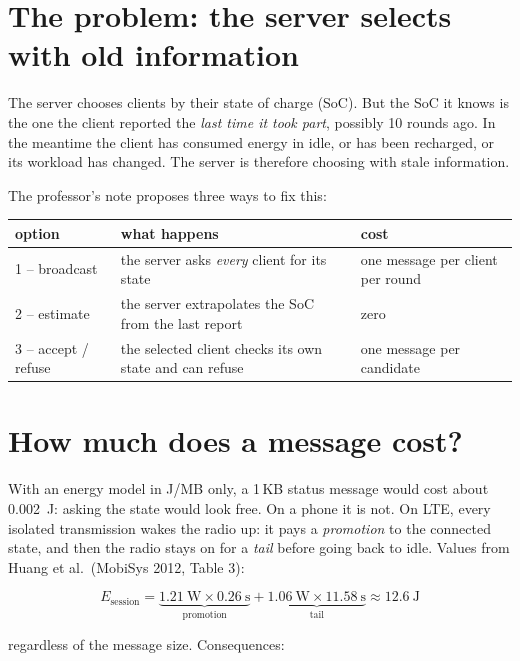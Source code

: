 \documentclass[11pt,a4paper]{article}
\begin{document}
\section{The problem: the server selects with old information}

The server chooses clients by their state of charge (SoC). But the SoC it knows
is the one the client reported the \emph{last time it took part}, possibly 10
rounds ago. In the meantime the client has consumed energy in idle, or has
been recharged, or its workload has changed. The server is therefore choosing
with stale information.

The professor's note proposes three ways to fix this:

\begin{center}
\begin{tabular}{lll}
\toprule
option & what happens & cost \\
\midrule
1 -- broadcast & the server asks \emph{every} client for its state & one message per client per round \\
2 -- estimate  & the server extrapolates the SoC from the last report & zero \\
3 -- accept / refuse & the selected client checks its own state and can refuse & one message per candidate \\
\bottomrule
\end{tabular}
\end{center}

\section{How much does a message cost?}

With an energy model in J/MB only, a 1\,KB status message would cost about
\SI{0.002}{\joule}: asking the state would look free. On a phone it is not.
On LTE, every isolated transmission wakes the radio up: it pays a
\emph{promotion} to the connected state, and then the radio stays on for a
\emph{tail} before going back to idle. Values from Huang et al.\ (MobiSys 2012,
Table 3):

\[
  E_{\text{session}} =
  \underbrace{\SI{1.21}{\watt}\times\SI{0.26}{\second}}_{\text{promotion}}
  + \underbrace{\SI{1.06}{\watt}\times\SI{11.58}{\second}}_{\text{tail}}
  \approx \SI{12.6}{\joule}
\]

regardless of the message size. Consequences:
\end{document}
